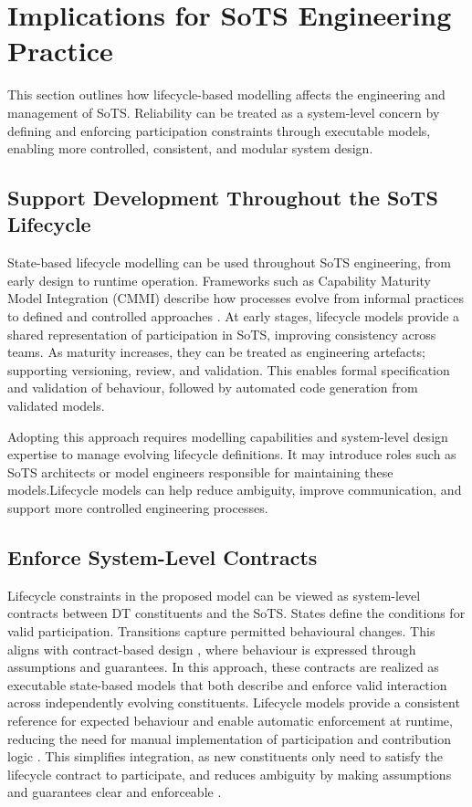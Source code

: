 \section{Implications for SoTS Engineering Practice}\label{sec:discussion-implications}
This section outlines how lifecycle-based modelling affects the engineering and management of SoTS. Reliability can be treated as a system-level concern by defining and enforcing participation constraints through executable models, enabling more controlled, consistent, and modular system design.

\subsection{Support Development Throughout the SoTS Lifecycle}
State-based lifecycle modelling can be used throughout SoTS engineering, from early design to runtime operation. Frameworks such as Capability Maturity Model Integration (CMMI) describe how processes evolve from informal practices to defined and controlled approaches \cite{paulk1991capability}. At early stages, lifecycle models provide a shared representation of participation in SoTS, improving consistency across teams. As maturity increases, they can be treated as engineering artefacts; supporting versioning, review, and validation. This enables formal specification and validation of behaviour, followed by automated code generation from validated models.

Adopting this approach requires modelling capabilities and system-level design expertise to manage evolving lifecycle definitions. It may introduce roles such as SoTS architects or model engineers responsible for maintaining these models.Lifecycle models can help reduce ambiguity, improve communication, and support more controlled engineering processes.

\subsection{Enforce System-Level Contracts}
Lifecycle constraints in the proposed model can be viewed as system-level contracts between DT constituents and the SoTS. States define the conditions for valid participation. Transitions capture permitted behavioural changes. This aligns with contract-based design \cite{benveniste2012contracts}, where behaviour is expressed through assumptions and guarantees. In this approach, these contracts are realized as executable state-based models that both describe and enforce valid interaction across independently evolving constituents.  Lifecycle models provide a consistent reference for expected behaviour and enable automatic enforcement at runtime, reducing the need for manual implementation of participation and contribution logic \cite{sangiovanni2012taming}. This simplifies integration, as new constituents only need to satisfy the lifecycle contract to participate, and reduces ambiguity by making assumptions and guarantees clear and enforceable \cite{waschle2021contract}.

